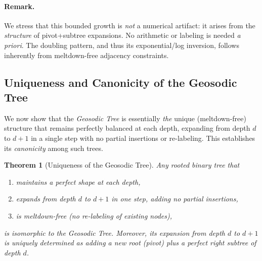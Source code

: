 \documentclass[acmsmall]{acmart}
\newtheorem{theorem}{Theorem}
\theoremstyle{definition}
\theoremstyle{remark}
\begin{document}
\paragraph{Remark.}
We stress that this bounded growth is \emph{not} a numerical artifact:
it arises from the \emph{structure} of pivot+subtree expansions.
No arithmetic or labeling is needed \emph{a priori}. The doubling
pattern, and thus its exponential/log inversion, follows inherently
from meltdown-free adjacency constraints.
 \subsection{Uniqueness and Canonicity of the Geosodic Tree}
\label{subsec:uniqueness}

We now show that the \emph{Geosodic Tree} is essentially \emph{the} unique
(meltdown-free) structure that remains perfectly balanced at each depth,
expanding from depth $d$ to $d+1$ in a single step with no partial
insertions or re-labeling. This establishes its \emph{canonicity} among such
trees.

\begin{theorem}[Uniqueness of the Geosodic Tree]
\label{thm:geosodic-uniqueness}
Any rooted binary tree that
\begin{enumerate}
  \item maintains a \emph{perfect} shape at each depth,
  \item expands from depth $d$ to $d+1$ in one step, adding no partial insertions,
  \item is \emph{meltdown-free} (no re-labeling of existing nodes),
\end{enumerate}
is isomorphic to the Geosodic Tree. Moreover, its expansion from depth $d$ to
$d+1$ is uniquely determined as adding a new root (pivot) plus a perfect right
subtree of depth $d$.
\end{theorem}
\end{document}
